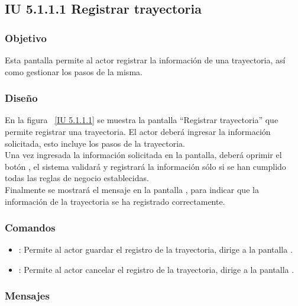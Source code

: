 \subsection{IU 5.1.1.1 Registrar trayectoria}

\subsubsection{Objetivo}
	
	Esta pantalla permite al actor registrar la información de una trayectoria, así como gestionar los pasos de la misma.

\subsubsection{Diseño}

    En la figura ~\ref{IU 5.1.1.1} se muestra la pantalla ``Registrar trayectoria'' que permite registrar una trayectoria. El actor deberá ingresar la información solicitada, 
    esto incluye los pasos de la trayectoria.\\
    
    
    Una vez ingresada la información solicitada en la pantalla, deberá oprimir el botón 
    , el sistema validará y registrará la información sólo si se han cumplido todas las reglas de negocio establecidas.  \\
    
    Finalmente se mostrará el mensaje  en la pantalla ,
    para indicar que la información de la trayectoria
    se ha registrado correctamente.        




\subsubsection{Comandos}
\begin{itemize}
	\item {}: Permite al actor guardar el registro de la trayectoria, dirige a la pantalla .
	\item {}: Permite al actor cancelar el registro de la trayectoria, dirige a la pantalla .
\end{itemize}

\subsubsection{Mensajes}

